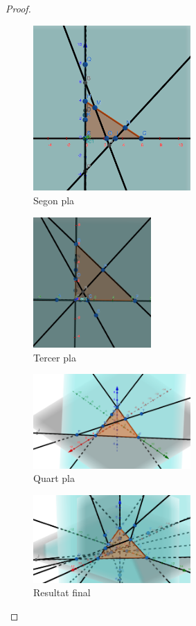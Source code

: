 \documentclass[12pt, a4papre]{article}
\begin{document}
\begin{proof}
	\begin{figure}[H]
		\begin{center}
		\includegraphics[width=60mm]{segon_pla.png}
		\caption{Segon pla}
		\end{center}
	\end{figure}
	
	\begin{figure}[H]
		\begin{center}
		\includegraphics[width=45mm]{tercer_pla.png}
		\caption{Tercer pla}
		\end{center}
	\end{figure}
	
	\begin{figure}[H]
		\begin{center}
		\includegraphics[width=60mm]{quart_pla.png}
		\caption{Quart pla}
		\end{center}
	\end{figure}
	
	\begin{figure}[H]
		\begin{center}
		\includegraphics[width=60mm]{final.png}
		\caption{Resultat final}
		\end{center}
	\end{figure}
	
	\end{proof}
	
	
	
	
\end{document}
